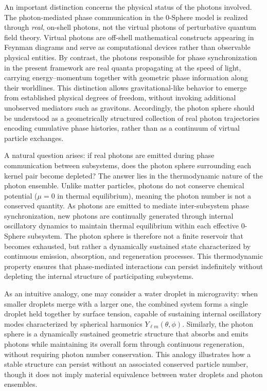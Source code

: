 \documentclass[
 reprint,
 amsmath,amssymb,
 aps,
 prb,
]{revtex4-2}
\numberwithin{equation}{section}
\begin{document}
An important distinction concerns the physical status of the photons involved. The photon-mediated phase communication in the 0-Sphere model is realized through \emph{real}, on-shell photons, not the virtual photons of perturbative quantum field theory. Virtual photons are off-shell mathematical constructs appearing in Feynman diagrams and serve as computational devices rather than observable physical entities. By contrast, the photons responsible for phase synchronization in the present framework are real quanta propagating at the speed of light, carrying energy--momentum together with geometric phase information along their worldlines. This distinction allows gravitational-like behavior to emerge from established physical degrees of freedom, without invoking additional unobserved mediators such as gravitons. Accordingly, the photon sphere should be understood as a geometrically structured collection of real photon trajectories encoding cumulative phase histories, rather than as a continuum of virtual particle exchanges.

A natural question arises: if real photons are emitted during phase communication between subsystems, does the photon sphere surrounding each kernel pair become depleted? The answer lies in the thermodynamic nature of the photon ensemble. Unlike matter particles, photons do not conserve chemical potential ($\mu = 0$ in thermal equilibrium), meaning the photon number is not a conserved quantity. As photons are emitted to mediate inter-subsystem phase synchronization, new photons are continually generated through internal oscillatory dynamics to maintain thermal equilibrium within each effective 0-Sphere subsystem. The photon sphere is therefore not a finite reservoir that becomes exhausted, but rather a dynamically sustained state characterized by continuous emission, absorption, and regeneration processes. This thermodynamic property ensures that phase-mediated interactions can persist indefinitely without depleting the internal structure of participating subsystems.

As an intuitive analogy, one may consider a water droplet in microgravity: when smaller droplets merge with a larger one, the combined system forms a single droplet held together by surface tension, capable of sustaining internal oscillatory modes characterized by spherical harmonics $Y_{\ell m}(\theta,\phi)$. Similarly, the photon sphere is a dynamically sustained geometric structure that absorbs and emits photons while maintaining its overall form through continuous regeneration, without requiring photon number conservation. This analogy illustrates how a stable structure can persist without an associated conserved particle number, though it does not imply material equivalence between water droplets and photon ensembles.
\end{document}
